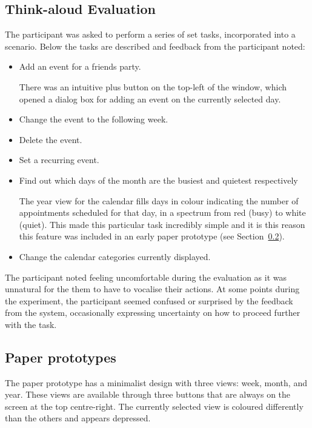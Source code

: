 \documentclass{article}
\begin{document}
\subsection{Think-aloud Evaluation}
The participant was asked to perform a series of set tasks, incorporated
into a scenario. Below the tasks are described and feedback from the
participant noted:

\begin{itemize}
\item Add an event for a friends party.

There was an intuitive plus button on the top-left of the window, which
opened a dialog box for adding an event on the currently selected day.

\item Change the event to the following week.

\item Delete the event.

\item Set a recurring event.

\item Find out which days of the month are the busiest and quietest
respectively

The year view for the calendar fills days in colour indicating the
number of appointments scheduled for that day, in a spectrum from
red (busy) to white (quiet). This made this particular task incredibly
simple and it is this reason this feature was included in an early
paper prototype (see Section~\ref{sec:osxpp}).

\item Change the calendar categories currently displayed.
\end{itemize}

The participant noted feeling uncomfortable during the evaluation as it
was unnatural for the them to have to vocalise their actions. At some
points during the experiment, the participant seemed confused or
surprised by the feedback from the system, occasionally expressing
uncertainty on how to proceed further with the task.

\subsection{Paper prototypes}
\label{sec:osxpp}

The paper prototype has a minimalist design with three views: week,
month, and year. These views are available through three buttons that
are always on the screen at the top centre-right. The currently selected
view is coloured differently than the others and appears depressed.
\end{document}
